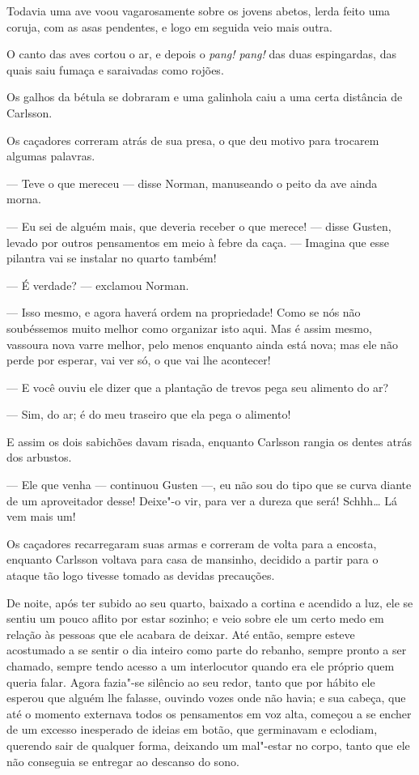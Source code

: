 Todavia uma ave voou vagarosamente sobre os jovens abetos, lerda feito uma
coruja, com as asas pendentes, e logo em seguida veio mais outra.

O canto das aves cortou o ar, e depois o \textit{pang! pang!} das duas
espingardas, das quais saiu fumaça e saraivadas como rojões.

Os galhos da bétula se dobraram e uma galinhola caiu a uma certa distância de
Carlsson.

Os caçadores correram atrás de sua presa, o que deu motivo para trocarem algumas
palavras.

--- Teve o que mereceu --- disse Norman, manuseando o peito da ave ainda morna.

--- Eu sei de alguém mais, que deveria receber o que merece! --- disse Gusten,
levado por outros pensamentos em meio à febre da caça. --- Imagina que esse
pilantra vai se instalar no quarto também!

--- É verdade? --- exclamou Norman.

--- Isso mesmo, e agora haverá ordem na propriedade! Como se nós não soubéssemos
muito melhor como organizar isto aqui. Mas é assim mesmo, vassoura nova varre
melhor, pelo menos enquanto ainda está nova; mas ele não perde por esperar, vai ver só,
o que vai lhe acontecer!

--- E você ouviu ele dizer que a plantação de trevos pega seu alimento do ar?

--- Sim, do ar; é do meu traseiro que ela pega o alimento!

E assim os dois sabichões davam risada, enquanto Carlsson rangia os dentes atrás dos
arbustos.

--- Ele que venha --- continuou Gusten ---, eu não sou do tipo que se curva diante
de um aproveitador desse! Deixe"-o vir, para ver a dureza que será! Schhh\ldots{}
Lá vem mais um!

Os caçadores recarregaram suas armas e correram de volta para a encosta,
enquanto Carlsson voltava para casa de mansinho, decidido a partir para o ataque
tão logo tivesse tomado as devidas precauções.

De noite, após ter subido ao seu quarto, baixado a cortina e acendido a luz, ele
se sentiu um pouco aflito por estar sozinho; e veio sobre ele um certo medo em
relação às pessoas que ele acabara de deixar. Até então, sempre esteve
acostumado a se sentir o dia inteiro como parte do rebanho, sempre pronto a
ser chamado, sempre tendo acesso a um interlocutor quando era ele próprio quem
queria falar. Agora fazia"-se silêncio ao seu redor, tanto que por hábito ele
esperou que alguém lhe falasse, ouvindo vozes onde não havia; e sua cabeça, que
até o momento externava todos os pensamentos em voz alta, começou a se encher de
um excesso inesperado de ideias em botão, que germinavam e eclodiam,
querendo sair de qualquer forma, deixando um mal"-estar no corpo, tanto que ele não
conseguia se entregar ao descanso do sono.

